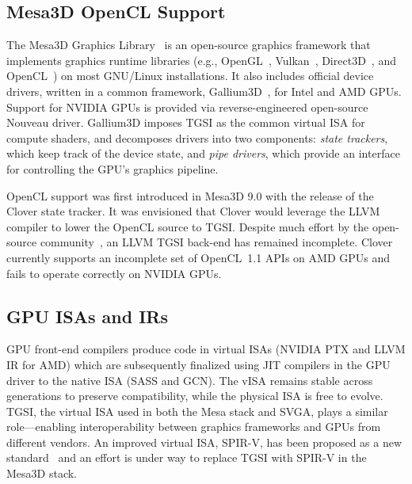 \subsection{Mesa3D OpenCL Support}

The Mesa3D Graphics Library~\cite{mesa} is an open-source graphics
framework that implements graphics runtime libraries (e.g., OpenGL~\cite{openGLspec}, Vulkan~\cite{Vulkanspec}, Direct3D~\cite{directX}, and OpenCL~\cite{stone2010opencl})
on most GNU/Linux installations.
It also includes official device drivers, written in a common framework, Gallium3D~\cite{gallium}, for Intel and AMD GPUs.
Support for NVIDIA GPUs is provided via reverse-engineered open-source Nouveau driver. Gallium3D imposes TGSI as the common
virtual ISA for compute shaders, and decomposes drivers into two
components: \textit{state trackers}, which keep track of the device
state, and \textit{pipe drivers}, which provide an interface for
controlling the GPU's graphics pipeline.

OpenCL support was first introduced in Mesa3D 9.0 with the release of the
Clover state tracker.
It was envisioned that Clover would leverage the LLVM~\cite{lattner2004llvm}
compiler to lower the OpenCL source to TGSI. Despite much effort by the
open-source community~\cite{old_llvm_tgsi1,old_llvm_tgsi2}, an LLVM TGSI back-end
has remained incomplete.
Clover currently supports an incomplete set of OpenCL~1.1 APIs on AMD GPUs and fails to operate
correctly on NVIDIA GPUs.

\subsection{GPU ISAs and IRs}

GPU front-end compilers produce code in virtual ISAs (NVIDIA PTX and LLVM IR for AMD) which are subsequently finalized using JIT compilers in the GPU driver to the native ISA (SASS and GCN).
The vISA remains stable across generations to preserve compatibility, while
the physical ISA is free to evolve. TGSI, the virtual ISA used in both the Mesa
stack and SVGA, plays a similar role---enabling interoperability
between graphics frameworks and GPUs from different vendors.
An improved virtual ISA, SPIR-V, has been proposed as a new standard~\cite{Vulkanspec} and an effort is under way to replace TGSI with SPIR-V in the Mesa3D stack.

